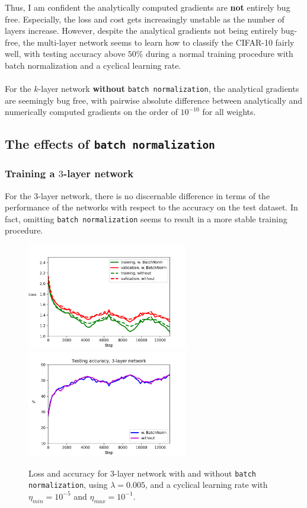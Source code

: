 \documentclass{article}
\begin{document}
	Thus, I am confident the analytically computed gradients are \textbf{not} entirely bug free. Especially, the loss and cost gets increasingly unstable as the number of layers increase. However, despite the analytical gradients not being entirely bug-free, the multi-layer network seems to learn how to classify the CIFAR-10 fairly well, with testing accuracy above $50$\% during a normal training procedure with batch normalization and a cyclical learning rate. \\\\
%
For the $k$-layer network \textbf{without} \texttt{batch normalization}, the analytical gradients are seemingly bug free, with pairwise absolute difference between analytically and numerically computed gradients on the order of $10^{-10}$ for all weights.

\newpage
\subsection*{The effects of \texttt{batch normalization}}
\vspace{0.5cm}

\subsubsection*{Training a $3$-layer network}
	For the $3$-layer network, there is no discernable difference in terms of the performance of the networks with respect to the accuracy on the test dataset. In fact, omitting \texttt{batch normalization} seems to result in a more stable training procedure. 
	\begin{figure}[h!]
		\centering
		\includegraphics[width=7cm]{../plots/loss_comp_3layer.png}
		\includegraphics[width=7cm]{../plots/acc_comp_3layer.png}
		\caption{Loss and accuracy for $3$-layer network with and without \texttt{batch normalization}, using $\lambda=0.005$, and a cyclical learning rate with $\eta_{min} = 10^{-5}$ and $\eta_{max} = 10^{-1}$.}
	\end{figure}
\end{document}
